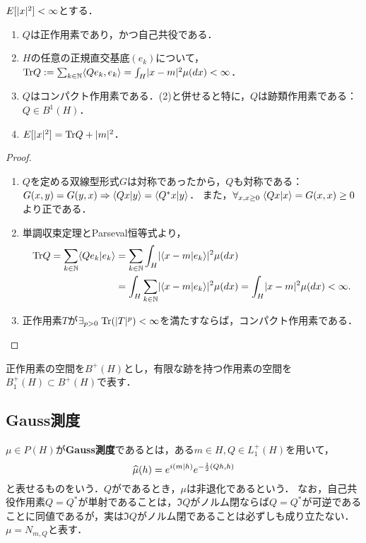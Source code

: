 \documentclass[uplatex,dvipdfmx]{jsreport}
\begin{document}
\begin{lemma}[共分散作用素の性質]
    $E[\lvert x\rvert^2]<\infty$とする．
    \begin{enumerate}
        \item $Q$は正作用素であり，かつ自己共役である．
        \item $H$の任意の正規直交基底$(e_k)$について，$\mathrm{Tr} Q:=\sum_{k\in\mathbb{N}}\langle Qe_k,e_k\rangle=\int_H\lvert x-m\rvert^2\mu(dx)<\infty$．
        \item $Q$はコンパクト作用素である．(2)と併せると特に，$Q$は跡類作用素である：$Q\in B^1(H)$．
        \item $E[\lvert x\rvert^2]=\mathrm{Tr} Q+\lvert m\rvert^2$．
    \end{enumerate}
\end{lemma}
\begin{proof}\mbox{}
    \begin{enumerate}
        \item $Q$を定める双線型形式$G$は対称であったから，$Q$も対称である：$G(x,y)=G(y,x)\Rightarrow\langle Qx|y\rangle=\langle Q^*x|y\rangle$．
        また，$\forall_{x,x\ge0}\;\langle Qx|x\rangle=G(x,x)\ge0$より正である．
        \item 単調収束定理とParseval恒等式より，
        \begin{align*}
            \mathrm{Tr} Q=\sum_{k\in\mathbb{N}}\langle Qe_k|e_k\rangle&=\sum_{k\in\mathbb{N}}\int_H\lvert\langle x-m|e_k\rangle\rvert^2\mu(dx)\\
            &=\int_H\sum_{k\in\mathbb{N}}\lvert\langle x-m|e_k\rangle\rvert^2\mu(dx)=\int_H\lvert x-m\rvert^2\mu(dx)<\infty.
        \end{align*}
        \item 正作用素$T$が$\exists_{p>0}\;\mathrm{Tr}(\lvert T\rvert^p)<\infty$を満たすならば，コンパクト作用素である．
    \end{enumerate}
\end{proof}

\begin{notation}
    正作用素の空間を$B^+(H)$とし，有限な跡を持つ作用素の空間を$B^+_1(H)\subset B^+(H)$で表す．
\end{notation}

\subsection{Gauss測度}

\begin{definition}
    $\mu\in P(H)$が\textbf{Gauss測度}であるとは，ある$m\in H,Q\in L^+_1(H)$を用いて，
    \[\widehat{\mu}(h)=e^{i(m|h)}e^{-\frac{1}{2}(Qh,h)}\]
    と表せるものをいう．$Q$がであるとき，$\mu$は非退化であるという．
    なお，自己共役作用素$Q=Q^*$が単射であることは，$\Im Q$がノルム閉ならば$Q=Q^*$が可逆であることに同値であるが，実は$\Im Q$がノルム閉であることは必ずしも成り立たない．
    $\mu=N_{m,Q}$と表す．
\end{definition}
\end{document}
